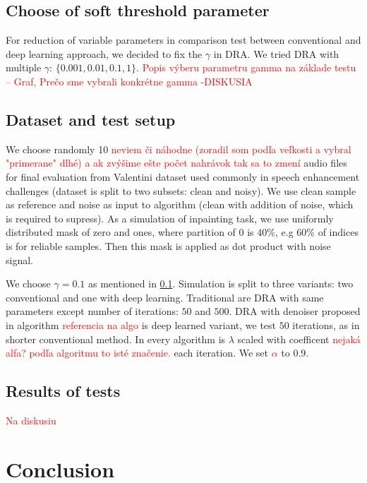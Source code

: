 \documentclass[conference]{IEEEtran}
\newcommand{\todo}[1]{\textcolor{red}{#1}}
\begin{document}
\subsection{Choose of soft threshold parameter}\label{subsec:soft_thresh}

For reduction of variable parameters in comparison test between conventional and deep learning approach, we decided to fix the $\gamma$ in DRA.
We tried DRA with multiple $\gamma$: $\{0.001, 0.01,0.1, 1\}$.
\todo{Popis výberu parametru gamma na základe testu -- Graf, Prečo sme vybrali konkrétne gamma -DISKUSIA}
\subsection{Dataset and test setup}
We choose randomly 10 \todo{neviem či náhodne (zoradil som podľa veľkosti a vybral "primerane" dlhé) a ak zvýšime ešte počet nahrávok tak sa to zmení} audio files for final evaluation from Valentini dataset \cite{ValentiniBotinhao2017} used commonly in speech enhancement challenges (dataset is split to two subsets: clean and noisy).
We use clean sample as reference and noise as input to algorithm (clean with addition of noise, which is required to supress).
As a simulation of inpainting task, we use uniformly distributed mask of zero and ones, where partition of 0 is $40\%$,
e.g $60\%$ of indices is for reliable samples.
Then this mask is applied as dot product with noise signal.

We choose $\gamma = 0.1$ as mentioned in \ref{subsec:soft_thresh}.
Simulation is split to three variants: two conventional and one with deep learning.
Traditional are DRA with same parameters except number of iterations: $50$ and $500$.
DRA with denoiser proposed in algorithm \todo{referencia na algo} is deep learned variant, we test $50$ iterations,
as in shorter conventional method.
In every algorithm is $\lambda$ scaled with coefficent \todo{nejaká alfa? podľa algoritmu to isté značenie.} each iteration.
We set \todo{$\alpha$} to $0.9$.




\subsection{Results of tests}

\todo{Na diskusiu}


\section{Conclusion}
\label{sec:conclusion}
\end{document}
